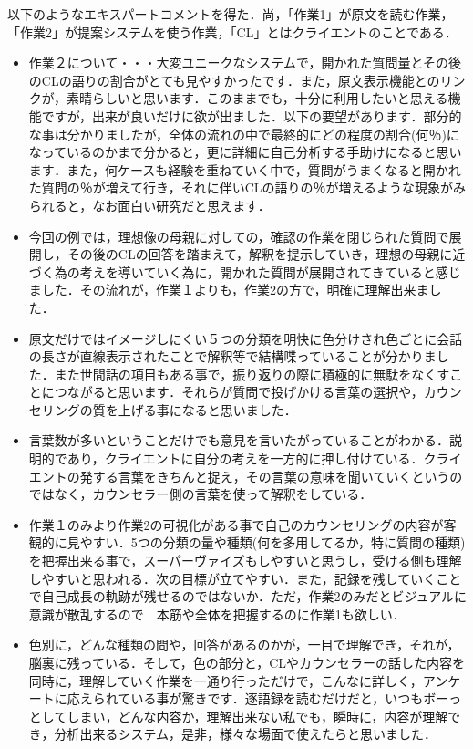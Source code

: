 \documentclass[shuuron]{kuee}
\begin{document}
以下のようなエキスパートコメントを得た．尚，「作業1」が原文を読む作業，「作業2」が提案システムを使う作業，「CL」とはクライエントのことである．
\begin{itemize}
  \item 作業２について・・・大変ユニークなシステムで，開かれた質問量とその後のCLの語りの割合がとても見やすかったです．また，原文表示機能とのリンクが，素晴らしいと思います．このままでも，十分に利用したいと思える機能ですが，出来が良いだけに欲が出ました．以下の要望があります．部分的な事は分かりましたが，全体の流れの中で最終的にどの程度の割合(何％)になっているのかまで分かると，更に詳細に自己分析する手助けになると思います．また，何ケースも経験を重ねていく中で，質問がうまくなると開かれた質問の％が増えて行き，それに伴いCLの語りの％が増えるような現象がみられると，なお面白い研究だと思えます．

  \item 今回の例では，理想像の母親に対しての，確認の作業を閉じられた質問で展開し，その後のCLの回答を踏まえて，解釈を提示していき，理想の母親に近づく為の考えを導いていく為に，開かれた質問が展開されてきていると感じました．その流れが，作業１よりも，作業2の方で，明確に理解出来ました．
  \item 原文だけではイメージしにくい５つの分類を明快に色分けされ色ごとに会話の長さが直線表示されたことで解釈等で結構喋っていることが分かりました．また世間話の項目もある事で，振り返りの際に積極的に無駄をなくすことにつながると思います．それらが質問で投げかける言葉の選択や，カウンセリングの質を上げる事になると思いました．

  \item 言葉数が多いということだけでも意見を言いたがっていることがわかる．説明的であり，クライエントに自分の考えを一方的に押し付けている．クライエントの発する言葉をきちんと捉え，その言葉の意味を聞いていくというのではなく，カウンセラー側の言葉を使って解釈をしている．
  \item 作業１のみより作業2の可視化がある事で自己のカウンセリングの内容が客観的に見やすい．5つの分類の量や種類(何を多用してるか，特に質問の種類)を把握出来る事で，スーパーヴァイズもしやすいと思うし，受ける側も理解しやすいと思われる．次の目標が立てやすい．また，記録を残していくことで自己成長の軌跡が残せるのではないか．ただ，作業2のみだとビジュアルに意識が散乱するので　本筋や全体を把握するのに作業1も欲しい．
  \item 色別に，どんな種類の問や，回答があるのかが，一目で理解でき，それが，脳裏に残っている．そして，色の部分と，CLやカウンセラーの話した内容を同時に，理解していく作業を一通り行っただけで，こんなに詳しく，アンケートに応えられている事が驚きです．逐語録を読むだけだと，いつもボーっとしてしまい，どんな内容か，理解出来ない私でも，瞬時に，内容が理解でき，分析出来るシステム，是非，様々な場面で使えたらと思いました．

\end{itemize}
\end{document}
